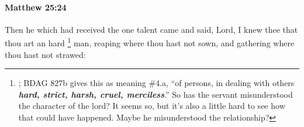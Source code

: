 			\begin{framed}
			\scriptsize
				\begin{compactdesc}
					\item[SBLG] 
				\end{compactdesc}
			\end{framed}

		\paragraph{Matthew 25:24} %
			\label{MATTHEW-25-24}

			Then he which had received the one talent came and said, Lord, I knew thee that thou art an hard%
				\footnote{%
					; BDAG 827b gives this as meaning \#4.a, ``of persons, in dealing with others \textbf{\textit{hard, strict, harsh, cruel, merciless}}.'' So has the servant misunderstood the character of the lord? It seems so, but it's also a little hard to see how that could have happened. Maybe he misunderstood the relationship?
					}
			man, reaping where thou hast not sown, and gathering where thou hast not strawed:

